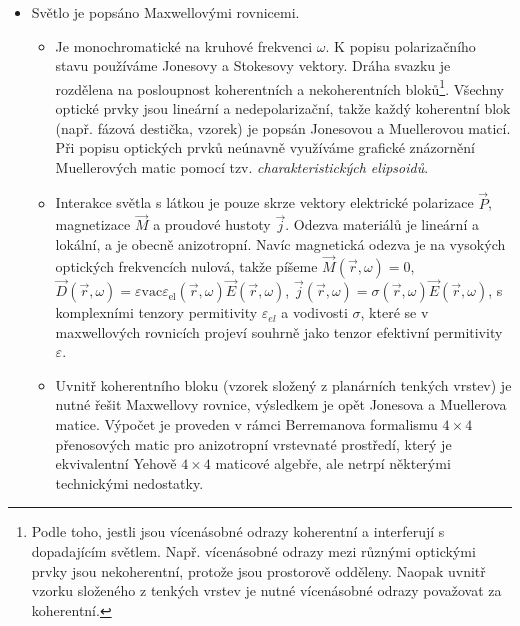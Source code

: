 \begin{itemize}
    \item Světlo je popsáno Maxwellovými rovnicemi.
        \begin{itemize}
            \item 
                Je monochromatické na kruhové frekvenci $\omega$. 
                K popisu polarizačního stavu používáme Jonesovy a Stokesovy vektory.
                Dráha svazku je rozdělena na posloupnost koherentních a nekoherentních bloků\footnote{Podle toho, jestli jsou vícenásobné odrazy koherentní a interferují s dopadajícím světlem. Např. vícenásobné odrazy mezi různými optickými prvky jsou nekoherentní, protože jsou prostorově odděleny. Naopak uvnitř vzorku složeného z tenkých vrstev je nutné vícenásobné odrazy považovat za koherentní.}.
                Všechny optické prvky jsou lineární a nedepolarizační, takže každý koherentní blok (např. fázová destička, vzorek) je popsán Jonesovou a Muellerovou maticí.
                Při popisu optických prvků neúnavně využíváme grafické znázornění Muellerových matic pomocí tzv. \emph{charakteristických elipsoidů}.
            \item 
                Interakce světla s látkou je pouze skrze vektory elektrické polarizace $\vec{P}$, magnetizace $\vec{M}$ a proudové hustoty $\vec{j}$. 
                Odezva materiálů je lineární a lokální, a je obecně anizotropní. 
                Navíc magnetická odezva je na vysokých optických frekvencích nulová, takže píšeme $\vec{M}(\vec{r},\omega)=0$, $\vec{D}(\vec{r},\omega)=\varepsilon{\textrm{vac}}\varepsilon_{\textrm{el}}(\vec{r},\omega)\vec{E}(\vec{r},\omega)$, $\vec{j}(\vec{r},\omega)=\sigma(\vec{r},\omega)\vec{E}(\vec{r},\omega)$, s komplexními tenzory permitivity $\varepsilon_{el}$ a vodivosti $\sigma$, které se v maxwellových rovnicích projeví souhrně jako tenzor efektivní permitivity $\varepsilon$.
            \item
                Uvnitř koherentního bloku (vzorek složený z planárních tenkých vrstev) je nutné řešit Maxwellovy rovnice, výsledkem je opět Jonesova a Muellerova matice.
                Výpočet je proveden v rámci Berremanova formalismu\todocite{} $4\times 4$ přenosových matic pro anizotropní vrstevnaté prostředí, který je ekvivalentní Yehově $4\times 4$ maticové algebře\todocite{}, ale netrpí některými technickými nedostatky\todocite{}.
        \end{itemize}
        

\end{itemize}
